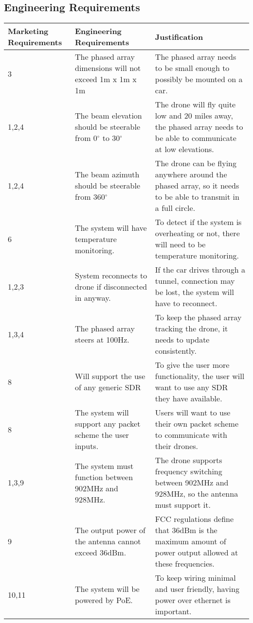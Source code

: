 \documentclass[ProductRequirements.tex]{subfiles}
\begin{document}
	\subsection{Engineering Requirements}
	\begin{center}
	\begin{tabular}{| p{2.3cm} | p{5cm} | p{7cm} |} \hline
		Marketing Requirements & Engineering Requirements & Justification \\ \hline \hline
		3 & The phased array dimensions will not exceed 1m x 1m x 1m & The phased array needs to be small enough to possibly be mounted on a car. \\ \hline
		1,2,4 & The beam elevation should be steerable from 0$^{\circ}$ to 30$^{\circ}$ & The drone will fly quite low and 20 miles away, the phased array needs to be able to communicate at low elevations.\\\hline
		1,2,4 & The beam azimuth should be steerable from 360$^{\circ}$ & The drone can be flying anywhere around the phased array, so it needs to be able to transmit in a full circle. \\\hline
		6 & The system will have temperature monitoring. & To detect if the system is overheating or not, there will need to be temperature monitoring. \\\hline
		1,2,3 & System reconnects to drone if disconnected in anyway. & If the car drives through a tunnel, connection may be lost, the system will have to reconnect. \\\hline
		1,3,4  & The phased array steers at 100Hz. & To keep the phased array tracking the drone, it needs to update consistently. \\\hline
		8 & Will support the use of any generic SDR & To give the user more functionality, the user will want to use any SDR they have available.\\\hline
		8 & The system will support any packet scheme the user inputs. & Users will want to use their own packet scheme to communicate with their drones.\\\hline
		1,3,9 & The system must function between 902MHz and 928MHz. & The drone supports frequency switching between 902MHz and 928MHz, so the antenna must support it.\\\hline
		 9 & The output power of the antenna cannot exceed 36dBm. & FCC regulations define that 36dBm is the maximum amount of power output allowed at these frequencies.\\\hline
		10,11 & The system will be powered by PoE. & To keep wiring minimal and user friendly, having power over ethernet is important. \\\hline

\end{tabular}
\end{center}
\end{document}
